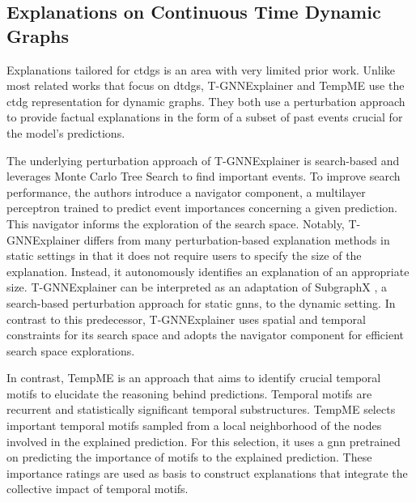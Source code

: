 \subsection{Explanations on Continuous Time Dynamic Graphs}
\label{s_relatedWork_CTDG}

Explanations tailored for \glspl{ctdg} is an area with very limited prior work. Unlike most related works that focus on \glspl{dtdg}, T-GNNExplainer \cite{xia_explaining_2023} and TempME \cite{chen_tempme_2023} use the \gls{ctdg} representation for dynamic graphs. They both use a perturbation approach to provide factual explanations in the form of a subset of past events crucial for the model's predictions.

The underlying perturbation approach of T-GNNExplainer is search-based and leverages Monte Carlo Tree Search to find important events. To improve search performance, the authors introduce a navigator component, a multilayer perceptron trained to predict event importances concerning a given prediction. This navigator informs the exploration of the search space. Notably, T-GNNExplainer differs from many perturbation-based explanation methods in static settings in that it does not require users to specify the size of the explanation. Instead, it autonomously identifies an explanation of an appropriate size. T-GNNExplainer can be interpreted as an adaptation of SubgraphX \cite{yuan_explainability_2021}, a search-based perturbation approach for static \glspl{gnn}, to the dynamic setting. In contrast to this predecessor, T-GNNExplainer uses spatial and temporal constraints for its search space and adopts the navigator component for efficient search space explorations.

In contrast, TempME is an approach that aims to identify crucial temporal motifs to elucidate the reasoning behind predictions. Temporal motifs are recurrent and statistically significant temporal substructures. TempME selects important temporal motifs sampled from a local neighborhood of the nodes involved in the explained prediction. For this selection, it uses a \gls{gnn} pretrained on predicting the importance of motifs to the explained prediction. These importance ratings are used as basis to construct explanations that integrate the collective impact of temporal motifs.



